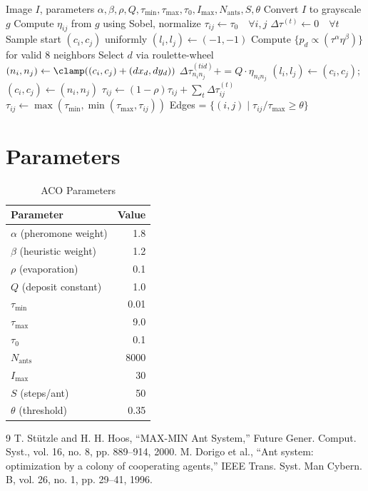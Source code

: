 \documentclass[11pt,a4paper]{article}
\begin{document}
\begin{algorithm}[H]
\caption{ACO Edge Detection}
\begin{algorithmic}[1]
\REQUIRE Image $I$, parameters $\alpha,\beta,\rho,Q,\tau_{\min},\tau_{\max},\tau_0,I_{\max},N_{\text{ants}},S,\theta$
\STATE Convert $I$ to grayscale $g$
\STATE Compute $\eta_{ij}$ from $g$ using Sobel, normalize
\STATE $\tau_{ij} \gets \tau_0 \quad \forall i,j$
    \STATE $\Delta\tau^{(t)} \gets 0 \quad \forall t$ 
     
        \STATE Sample start $(c_i,c_j)$ uniformly
        \STATE $(l_i,l_j) \gets (-1,-1)$ 
            \STATE Compute $\{p_d \propto (\tau^\alpha \eta^\beta)\}$ for valid 8 neighbors 
            \STATE Select $d$ via roulette-wheel
            \STATE $(n_i,n_j) \gets \clamp((c_i,c_j) + (dx_d,dy_d))$
            \STATE $\Delta\tau^{(tid)}_{n_in_j} += Q \cdot \eta_{n_in_j}$
            \STATE $(l_i,l_j) \gets (c_i,c_j)$; $(c_i,c_j) \gets (n_i,n_j)$
        \ENDFOR
    \ENDFOR
        \STATE $\tau_{ij} \gets (1-\rho)\tau_{ij} + \sum_t \Delta\tau^{(t)}_{ij}$
        \STATE $\tau_{ij} \gets \max(\tau_{\min}, \min(\tau_{\max}, \tau_{ij}))$
    \ENDFOR
\ENDFOR
\STATE \RETURN Edges = $\{(i,j) \mid \tau_{ij}/\tau_{\max} \geq \theta \}$
\end{algorithmic}
\end{algorithm}

\section{Parameters}
\begin{table}[h]
\centering
\begin{tabular}{@{}lr@{}}
\toprule
Parameter & Value \\
\midrule
$\alpha$ (pheromone weight) & 1.8 \\
$\beta$ (heuristic weight) & 1.2 \\
$\rho$ (evaporation) & 0.1 \\
$Q$ (deposit constant) & 1.0 \\
$\tau_{\min}$ & 0.01 \\
$\tau_{\max}$ & 9.0 \\
$\tau_0$ & 0.1 \\
$N_{\text{ants}}$ & 8000 \\
$I_{\max}$ & 30 \\
$S$ (steps/ant) & 50 \\
$\theta$ (threshold) & 0.35 \\
\bottomrule
\end{tabular}
\caption{ACO Parameters}
\end{table}


\begin{thebibliography}{9}
 T. Stützle and H. H. Hoos, ``MAX-MIN Ant System,'' Future Gener. Comput. Syst., vol. 16, no. 8, pp. 889–914, 2000.
 M. Dorigo et al., ``Ant system: optimization by a colony of cooperating agents,'' IEEE Trans. Syst. Man Cybern. B, vol. 26, no. 1, pp. 29–41, 1996.
\end{thebibliography}
\end{document}
